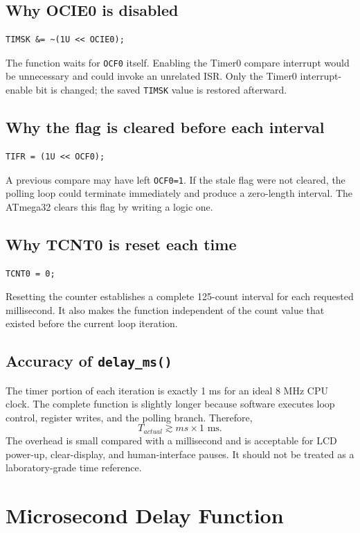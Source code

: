 \documentclass[11pt,a4paper]{article}
\begin{document}
\subsection{Why OCIE0 is disabled}
\begin{lstlisting}[style=cstyle]
TIMSK &= ~(1U << OCIE0);
\end{lstlisting}
The function waits for \texttt{OCF0} itself. Enabling the Timer0 compare interrupt would be unnecessary and could invoke an unrelated ISR. Only the Timer0 interrupt-enable bit is changed; the saved \texttt{TIMSK} value is restored afterward.

\subsection{Why the flag is cleared before each interval}
\begin{lstlisting}[style=cstyle]
TIFR = (1U << OCF0);
\end{lstlisting}
A previous compare may have left \texttt{OCF0=1}. If the stale flag were not cleared, the polling loop could terminate immediately and produce a zero-length interval. The ATmega32 clears this flag by writing a logic one.

\subsection{Why TCNT0 is reset each time}
\begin{lstlisting}[style=cstyle]
TCNT0 = 0;
\end{lstlisting}
Resetting the counter establishes a complete 125-count interval for each requested millisecond. It also makes the function independent of the count value that existed before the current loop iteration.

\subsection{Accuracy of \texttt{delay\_ms()}}
The timer portion of each iteration is exactly 1 ms for an ideal 8 MHz CPU clock. The complete function is slightly longer because software executes loop control, register writes, and the polling branch. Therefore,
\[
T_{actual}\gtrsim ms\times1\text{ ms}.
\]
The overhead is small compared with a millisecond and is acceptable for LCD power-up, clear-display, and human-interface pauses. It should not be treated as a laboratory-grade time reference.

\section{Microsecond Delay Function}
\end{document}
